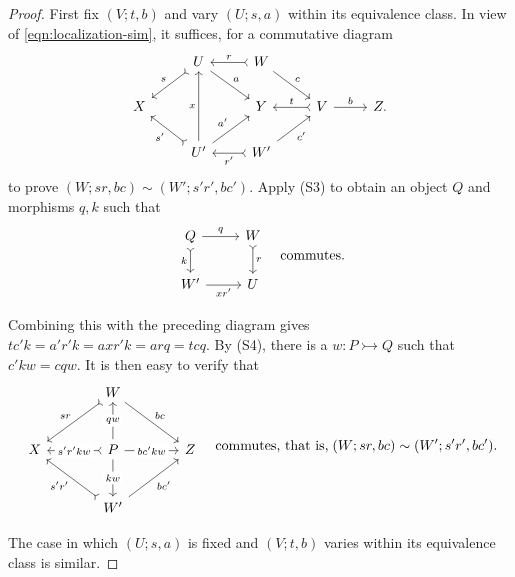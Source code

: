 \begin{proof}
	First fix $(V;t,b)$ and vary $(U;s,a)$ within its equivalence class. In
	view of \eqref{eqn:localization-sim}, it suffices, for a commutative diagram
	\[\begin{tikzcd}
		& U \arrow[rightarrowtail, ld, "s"'] \arrow[rd, "a"] & W \arrow[rightarrowtail, l, "r"'] \arrow[rd, "c"] & & \\
		X & & Y & V \arrow[r, "b"] \arrow[rightarrowtail, l, "t"'] & Z . \\
		& U' \arrow[rightarrowtail, lu, "{s'}"] \arrow[ru, "{a'}"] \arrow[uu, "x"] & W' \arrow[rightarrowtail, l, "{r'}"] \arrow[ru, "{c'}"'] & &
	\end{tikzcd}\]
	to prove $(W;sr,bc)\sim(W';s'r',bc')$. Apply (S3) to obtain an object
	$Q$ and morphisms $q,k$ such that
	\[\begin{tikzcd}
		Q \arrow[rightarrowtail, d, "k"'] \arrow[r, "q"] & W \arrow[rightarrowtail, d, "r"] \\
		W' \arrow[r, "{xr'}"'] & U
	\end{tikzcd} \quad \text{commutes}. \]

	Combining this with the preceding diagram gives
	$tc'k=a'r'k=axr'k=arq=tcq$. By (S4), there is a
	$w:P\rightarrowtail Q$ such that $c'kw=cqw$. It is then easy to verify that
	\[\begin{tikzcd}[column sep=large, row sep=large]
		& W \arrow[rightarrowtail, ld, "sr"'] \arrow[rd, "bc"] & \\
		X & P \arrow[r, "{bc'kw}" description] \arrow[rightarrowtail, l, "{s'r'kw}" description] \arrow[u, "qw" description] \arrow[d, "{kw}" description] & Z \\
		& W' \arrow[rightarrowtail, lu, "{s'r'}"] \arrow[ru, "{bc'}"'] &
	\end{tikzcd} \quad \text{commutes, that is,}\; (W;sr,bc)\sim(W';s'r',bc'). \]

	The case in which $(U;s,a)$ is fixed and $(V;t,b)$ varies within its
	equivalence class is similar.
\end{proof}

